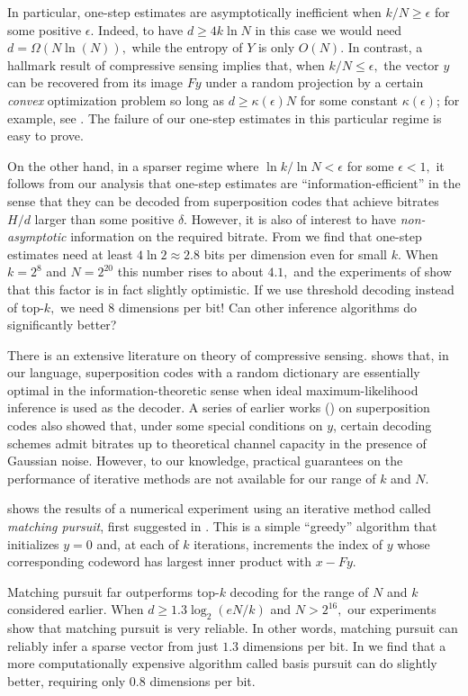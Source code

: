 In particular, one-step estimates are asymptotically inefficient when $k/N \ge \epsilon$ for some positive $\epsilon.$ Indeed, to have $d \ge 4 k \ln N$ in this case we would need $d = \Omega(N \ln(N)),$ while the entropy of $Y$ is only $O(N).$ In contrast, a hallmark result of compressive sensing implies that, when $k/N \le \epsilon,$ the vector $y$ can be recovered from its image $F y$ under a random projection by a certain \textit{convex} optimization problem so long as $d \ge \kappa(\epsilon) N$ for some constant $\kappa(\epsilon)$; for example, see \cite{candes_decoding_2005}. The failure of our one-step estimates in this particular regime is easy to prove.

On the other hand, in a sparser regime where $\ln k / \ln N < \epsilon$ for some $\epsilon < 1,$ it follows from our analysis that one-step estimates are ``information-efficient'' in the sense that they can be decoded from superposition codes that achieve bitrates $H/d$ larger than some positive $\delta.$ However, it is also of interest to have \textit{non-asymptotic} information on the required bitrate. From  we find that one-step estimates need at least $4 \ln 2 \approx 2.8$ bits per dimension even for small $k.$ When $k = 2^8$ and $N = 2^{20}$ this number rises to about $4.1,$ and the experiments of  show that this factor is in fact slightly optimistic. If we use threshold decoding instead of top-$k,$ we need $8$ dimensions per bit! Can other inference algorithms do significantly better?

There is an extensive literature on theory of compressive sensing. \cite{reeves_all-or-nothing_2019} shows that, in our language, superposition codes with a random dictionary are essentially optimal in the information-theoretic sense when ideal maximum-likelihood inference is used as the decoder. A series of earlier works (\cite{joseph_least_2012, joseph_fast_2014, rush_capacity-achieving_2017}) on superposition codes also showed that, under some special conditions on $y$, certain decoding schemes admit bitrates up to theoretical channel capacity in the presence of Gaussian noise. However, to our knowledge, practical guarantees on the performance of iterative methods are not available for our range of $k$ and $N.$

 shows the results of a numerical experiment using an iterative method called \textit{matching pursuit}, first suggested in \cite{bergeaud_matching_1995}. This is a simple ``greedy'' algorithm that initializes $y = 0$ and, at each of $k$ iterations, increments the index of $y$ whose corresponding codeword has largest inner product with $x - Fy.$

Matching pursuit far outperforms top-$k$ decoding for the range of $N$ and $k$ considered earlier. When $d \ge 1.3 \log_2 (e N /k)$ and $N > 2^{16},$ our experiments show that matching pursuit is very reliable. In other words, matching pursuit can reliably infer a sparse vector from just $1.3$ dimensions per bit. In  we find that a more computationally expensive algorithm called basis pursuit can do slightly better, requiring only 0.8 dimensions per bit.
